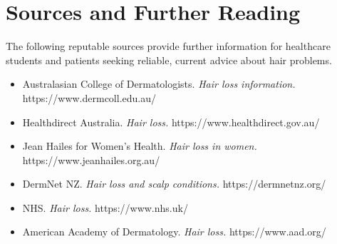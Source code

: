 \section*{Sources and Further Reading}
The following reputable sources provide further information for healthcare students and patients seeking reliable, current advice about hair problems.

\begin{itemize}
    \item Australasian College of Dermatologists. \textit{Hair loss information.} https://www.dermcoll.edu.au/
    \item Healthdirect Australia. \textit{Hair loss.} https://www.healthdirect.gov.au/
    \item Jean Hailes for Women's Health. \textit{Hair loss in women.} https://www.jeanhailes.org.au/
    \item DermNet NZ. \textit{Hair loss and scalp conditions.} https://dermnetnz.org/
    \item NHS. \textit{Hair loss.} https://www.nhs.uk/
    \item American Academy of Dermatology. \textit{Hair loss.} https://www.aad.org/
\end{itemize}
